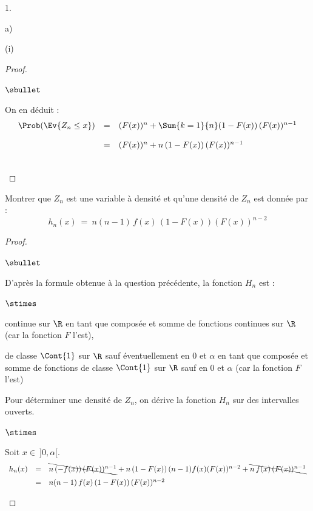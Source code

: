 \documentclass[11pt]{article}%
\begin{document}
\begin{noliste}{1.}
\begin{noliste}{a)}
\begin{nonoliste}{(i)}
\begin{proof}
\begin{noliste}{$\sbullet$}
	  \item On en déduit :
	  \[
	    \begin{array}{rcl}
	      \Prob(\Ev{Z_n \leq x}) & = & (F(x))^n + 
	      \Sum{k=1}{n} (1-F(x)) \, (F(x))^{n-1}
	      \\[.4cm]
	      & = & (F(x))^n + n \, (1-F(x)) \, (F(x))^{n-1}
	    \end{array}
	  \]
        \end{noliste}
        ~\\[-1cm]
      \end{proof}

    \end{nonoliste}
    
    \item Montrer que $Z_n$ est une variable à densité et qu'une 
    densité de $Z_n$ est donnée par :
    \[
      h_n(x) \ = \ n(n-1) \, f(x) \, (1-F(x))(F(x))^{n-2}
    \]
    
    \begin{proof}~
      \begin{noliste}{$\sbullet$}
	\item D'après la formule obtenue à la question précédente, 
	la fonction $H_n$ est :
	\begin{noliste}{$\stimes$}
	  \item continue sur $\R$ en tant que composée et somme de 
	  fonctions continues sur $\R$ (car la fonction $F$ l'est),
	  
	  \item de classe $\Cont{1}$ sur $\R$ sauf éventuellement 
	  en $0$ et $\alpha$ en tant que composée et somme de 
	  fonctions de classe $\Cont{1}$ sur $\R$ sauf 
	  en $0$ et $\alpha$ (car la fonction $F$ l'est)
	\end{noliste}
	
	
	
	
	\item Pour déterminer une densité de $Z_n$, on dérive la 
	fonction $H_n$ sur des intervalles ouverts.
	\begin{noliste}{$\stimes$}
	  \item Soit $x\in \ ]0, \alpha[$.
	  \[
	    \begin{array}{rcl}
	      h_n(x) & = & \bcancel{n \, (-f(x)) \, (F(x))^{n-1}} + n \, 
	      (1-F(x)) \, (n-1)f(x)(F(x))^{n-2} + 
	      \bcancel{n \, f(x) \, (F(x))^{n-1}}
	      \\[.2cm]
	      & = & n(n-1) \, f(x) \, (1-F(x)) \, (F(x))^{n-2}
	    \end{array}
	  \]
	  

\end{noliste}
\end{noliste}
\end{proof}
\end{noliste}
\end{noliste}
\end{document}
